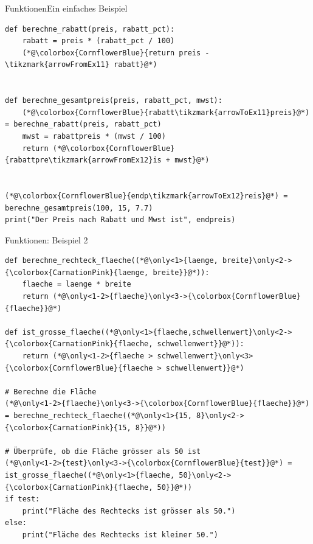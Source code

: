 \begin{frame}[fragile]{Funktionen}{Ein einfaches Beispiel}
\begin{lstlisting}
def berechne_rabatt(preis, rabatt_pct):
    rabatt = preis * (rabatt_pct / 100)
    (*@\colorbox{CornflowerBlue}{return preis - \tikzmark{arrowFromEx11} rabatt}@*)


def berechne_gesamtpreis(preis, rabatt_pct, mwst):
    (*@\colorbox{CornflowerBlue}{rabatt\tikzmark{arrowToEx11}preis}@*) = berechne_rabatt(preis, rabatt_pct)
    mwst = rabattpreis * (mwst / 100)
    return (*@\colorbox{CornflowerBlue}{rabattpre\tikzmark{arrowFromEx12}is + mwst}@*) 


(*@\colorbox{CornflowerBlue}{endp\tikzmark{arrowToEx12}reis}@*) = berechne_gesamtpreis(100, 15, 7.7)
print("Der Preis nach Rabatt und Mwst ist", endpreis)
\end{lstlisting}

\end{frame}

\begin{frame}[fragile]{Funktionen: Beispiel 2}
\begin{lstlisting}
def berechne_rechteck_flaeche((*@\only<1>{laenge, breite}\only<2->{\colorbox{CarnationPink}{laenge, breite}}@*)):
    flaeche = laenge * breite
    return (*@\only<1-2>{flaeche}\only<3->{\colorbox{CornflowerBlue}{flaeche}}@*)

def ist_grosse_flaeche((*@\only<1>{flaeche,schwellenwert}\only<2->{\colorbox{CarnationPink}{flaeche, schwellenwert}}@*)):
    return (*@\only<1-2>{flaeche > schwellenwert}\only<3>{\colorbox{CornflowerBlue}{flaeche > schwellenwert}}@*)

# Berechne die Fläche
(*@\only<1-2>{flaeche}\only<3->{\colorbox{CornflowerBlue}{flaeche}}@*) = berechne_rechteck_flaeche((*@\only<1>{15, 8}\only<2->{\colorbox{CarnationPink}{15, 8}}@*))

# Überprüfe, ob die Fläche grösser als 50 ist
(*@\only<1-2>{test}\only<3->{\colorbox{CornflowerBlue}{test}}@*) = ist_grosse_flaeche((*@\only<1>{flaeche, 50}\only<2->{\colorbox{CarnationPink}{flaeche, 50}}@*))
if test:
    print("Fläche des Rechtecks ist grösser als 50.")
else:
    print("Fläche des Rechtecks ist kleiner 50.")
\end{lstlisting}
\end{frame}

